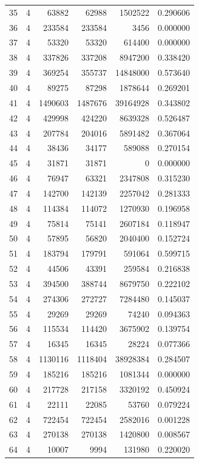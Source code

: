 \begin{longtable}{rrrrrr}
35 & 4 & 63882 & 62988 & 1502522 & 0.290606\\
36 & 4 & 233584 & 233584 & 3456 & 0.000000\\
37 & 4 & 53320 & 53320 & 614400 & 0.000000\\
38 & 4 & 337826 & 337208 & 8947200 & 0.338420\\
39 & 4 & 369254 & 355737 & 14848000 & 0.573640\\
40 & 4 & 89275 & 87298 & 1878644 & 0.269201\\
41 & 4 & 1490603 & 1487676 & 39164928 & 0.343802\\
42 & 4 & 429998 & 424220 & 8639328 & 0.526487\\
43 & 4 & 207784 & 204016 & 5891482 & 0.367064\\
44 & 4 & 38436 & 34177 & 589088 & 0.270154\\
45 & 4 & 31871 & 31871 & 0 & 0.000000\\
46 & 4 & 76947 & 63321 & 2347808 & 0.315230\\
47 & 4 & 142700 & 142139 & 2257042 & 0.281333\\
48 & 4 & 114384 & 114072 & 1270930 & 0.196958\\
49 & 4 & 75814 & 75141 & 2607184 & 0.118947\\
50 & 4 & 57895 & 56820 & 2040400 & 0.152724\\
51 & 4 & 183794 & 179791 & 591064 & 0.599715\\
52 & 4 & 44506 & 43391 & 259584 & 0.216838\\
53 & 4 & 394500 & 388744 & 8679750 & 0.222102\\
54 & 4 & 274306 & 272727 & 7284480 & 0.145037\\
55 & 4 & 29269 & 29269 & 74240 & 0.094363\\
56 & 4 & 115534 & 114420 & 3675902 & 0.139754\\
57 & 4 & 16345 & 16345 & 28224 & 0.077366\\
58 & 4 & 1130116 & 1118404 & 38928384 & 0.284507\\
59 & 4 & 185216 & 185216 & 1081344 & 0.000000\\
60 & 4 & 217728 & 217158 & 3320192 & 0.450924\\
61 & 4 & 22111 & 22085 & 53760 & 0.079224\\
62 & 4 & 722454 & 722454 & 2582016 & 0.001228\\
63 & 4 & 270138 & 270138 & 1420800 & 0.008567\\
64 & 4 & 10007 & 9994 & 131980 & 0.220020\\

\end{longtable}
